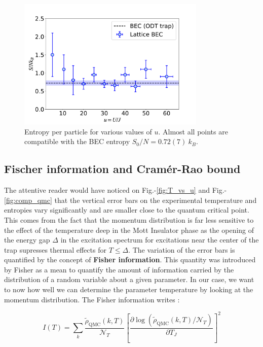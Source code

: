 \begin{figure}
    \centering
    \includegraphics[width=0.8\textwidth]{Fig/Chapter3/entropy_BEC.pdf}
    \caption[Entropy per particle for various values of $u$]{Entropy per particle for various values of $u$. Almost all points are compatible with the BEC entropy $S_{0} / N= 0.72(7) \ k_{B}$.}
    \label{fig:entropy_BEC}
\end{figure}




\subsection{Fischer information and Cramér-Rao bound}

The attentive reader would have noticed on Fig.-\ref{fig:T_vs_u} and Fig.-\ref{fig:comp_qmc} that the vertical error bars on the experimental temperature and entropies vary significantly and are smaller close to the quantum critical point. This comes from the fact that the momentum distribution is far less sensitive to the effect of the temperature deep in the Mott Insulator phase as the opening of the energy gap $\Delta$ in the excitation spectrum for excitations near the center of the trap supresses thermal effects for $T \leq \Delta$. The variation of the error bars is quantified by the concept of \textbf{Fisher information}. This quantity was introduced by Fisher \cite{fisher1922mathematical} as a mean to quantify the amount of information carried by the distribution of a random variable about a given parameter. In our case, we want to now how well we can determine the parameter temperature by looking at the momentum distribution. The Fisher information writes \cite{van2007parameter}:

\begin{equation}
    I(T)=\sum_{k} \frac{\tilde{\rho}_{\mathrm{QMC}}(k, T)}{\mathcal{N}_{T}}\left[\frac{\partial \log \left(\tilde{\rho}_{\mathrm{QMC}}(k, T) / \mathcal{N}_{T}\right)}{\partial T_{J}}\right]^{2}
\end{equation}



